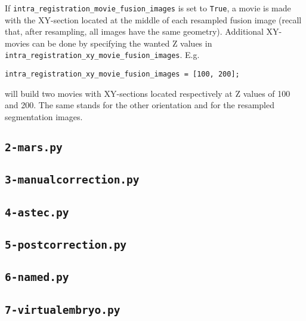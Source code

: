 If \verb|intra_registration_movie_fusion_images| is set to \verb|True|, a movie is made with the  XY-section located at the middle of each resampled fusion image (recall that, after resampling, all images have the same geometry). Additional XY-movies can be done by specifying the wanted Z values in \verb|intra_registration_xy_movie_fusion_images|. E.g.
\begin{verbatim}
intra_registration_xy_movie_fusion_images = [100, 200];
\end{verbatim}
will build two movies with XY-sections located respectively at Z values of 100 and 200. The same stands for the other orientation and for the resampled segmentation images.


\subsection{\texttt{2-mars.py}}

\subsection{\texttt{3-manualcorrection.py}}

\subsection{\texttt{4-astec.py}}

\subsection{\texttt{5-postcorrection.py}}

\subsection{\texttt{6-named.py}}

\subsection{\texttt{7-virtualembryo.py}}





